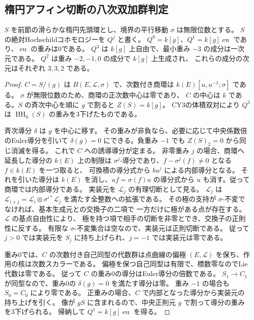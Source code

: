 \subsection{楕円アフィン切断の八次双加群判定}
\label{subsec:cubic-CY-three-alpha-elliptic-diagonal}

\begin{lemma}\label{lem:cubic-CY-three-alpha-elliptic-absolute-HH}
$S$ を前節の滑らかな楕円先頭環とし、境界の平行移動 $\sigma$ は無限位数とする。
$S$ の絶対Hochschildコホモロジーを $Q^j$ と書く。
$Q^0=k[g]$、$Q^1=k[g]\operatorname{eu}$ であり、$\operatorname{eu}$ の重みは0である。
$Q^3$ は $k[g]$ 上自由で、最小重み $-3$ の成分は一次元である。
$Q^2$ は重み $-2,-1,0$ の成分で $k[g]$ 上生成され、
これらの成分の次元はそれぞれ $3,3,2$ である。
\end{lemma}
\begin{proof}
$C=S/(g)$ は $B(E,\mathcal L,\sigma)$ で、次数付き商環は
$k(E)[u,u^{-1};\sigma]$ である。
$\sigma$ が無限位数のため、商環の正次数中心は零であり、
$C$ の中心は $k$ である。$S$ の斉次中心を順に $g$ で割ると $Z(S)=k[g]$。
CY3の体積双対により $Q^3$ は $\operatorname{HH}_0(S)$ の重みを3下げたものである。

斉次導分 $\delta$ は $g$ を中心に移す。
その重みが非負なら、必要に応じて中央係数倍のEuler導分を引いて
$\delta(g)=0$ にできる。負重み $-1$ でも $Z(S)_2=0$ から同じ消滅を得る。
これで $C$ への誘導導分が定まる。
非零重み $j$ の場合、商環へ延長した導分の $k(E)$ 上の制限は
$\sigma^j$-導分であり、$f-\sigma^j(f)\ne0$ となる $f\in k(E)$ を一つ取ると、
可換積の導分式から $b u^j$ による内部導分となる。
それを引いた導分は $k(E)$ を消し、$u f=\sigma(f)u$ の導分式から
$u$ も消す。従って商環では内部導分である。
実装元を $\mathcal L_j$ の有理切断として見る。
$\mathcal L_j$ は $\mathcal L_{i+j}=\mathcal L_i\otimes\sigma^{i*}\mathcal L_j$
を満たす全整数への拡張である。
その極の支持が $\sigma$-不変でなければ、基本生成元との交換子の二項で
一方だけに極がある点が存在する。$\mathcal L$ の基点自由性により、
極を持つ項で相手の切断を非零とでき、交換子の正則性に反する。
有限な $\sigma$-不変集合は空なので、実装元は正則切断である。
従って $j>0$ では実装元を $S_j$ に持ち上げられ、$j=-1$ では実装元は零である。

重み0では、$C$ の次数付き自己同型の代数群は点曲線の偏極
$(E,\mathcal L)$ を保ち、作用の核は次数スカラーである。
偏極を保つ自己同型は有限で、標数零なのでLie代数は零である。
従って $C$ の重み0の導分はEuler導分の倍数である。
$S_1\to C_1$ が同型なので、重み0の $\delta(g)=0$ を満たす導分は零。
重み $-1$ の場合も $S_0=C_0$ により零である。
正重みの場合、$C$ で内部となった導分から実装元の持ち上げを引く。
像が $gS$ に含まれるので、中央正則元 $g$ で割って導分の重みを3下げられる。
帰納して $Q^1=k[g]\operatorname{eu}$ を得る。


\end{proof}
